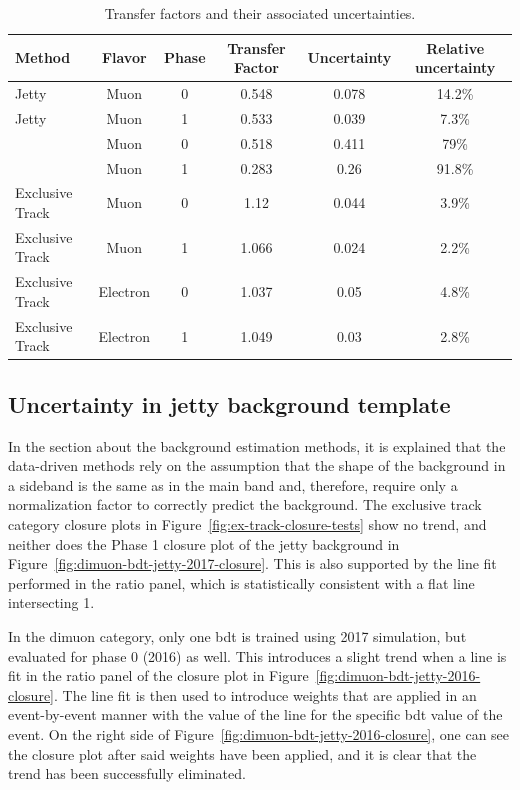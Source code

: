 \begin{table}[hp]
	\centering
	\label{tab:transfer-factors}
		\caption{Transfer factors and their associated uncertainties.}
			\begin{tabular}{lccccc} \hline
			Method & Flavor & Phase & Transfer Factor & Uncertainty & Relative uncertainty \\ \hline
			Jetty & Muon & 0 &  0.548 & 0.078 & 14.2\% \\
			Jetty & Muon & 1 &  0.533 & 0.039 & 7.3\% \\
			\tautau & Muon & 0 &  0.518 & 0.411 & 79\% \\
			\tautau & Muon & 1 &  0.283 & 0.26 & 91.8\% \\
			Exclusive Track & Muon & 0 & 1.12 & 0.044 & 3.9\% \\ 
			Exclusive Track & Muon & 1 & 1.066 & 0.024 & 2.2\% \\	
			Exclusive Track & Electron & 0 & 1.037 & 0.05 & 4.8\% \\	
			Exclusive Track & Electron & 1 & 1.049 & 0.03 & 2.8\% \\			
			
			\hline
			\end{tabular}
\end{table}

\subsection{Uncertainty in jetty background template}
\label{sec:data-driven-shape}

In the section about the background estimation methods, it is explained that the data-driven methods rely on the assumption that the shape of the background in a sideband is the same as in the main band and, therefore, require only a normalization factor to correctly predict the background. The exclusive track category closure plots in Figure~\ref{fig:ex-track-closure-tests} show no trend, and neither does the Phase 1 closure plot of the jetty background in Figure~\ref{fig:dimuon-bdt-jetty-2017-closure}. This is also supported by the line fit performed in the ratio panel, which is statistically consistent with a flat line intersecting 1.

In the dimuon category, only one \gls{bdt} is trained using 2017 simulation, but evaluated for phase 0 (2016) as well. This introduces a slight trend when a line is fit in the ratio panel of the closure plot in Figure~\ref{fig:dimuon-bdt-jetty-2016-closure}. The line fit is then used to introduce weights that are applied in an event-by-event manner with the value of the line for the specific \gls{bdt} value of the event. On the right side of Figure~\ref{fig:dimuon-bdt-jetty-2016-closure}, one can see the closure plot after said weights have been applied, and it is clear that the trend has been successfully eliminated.

